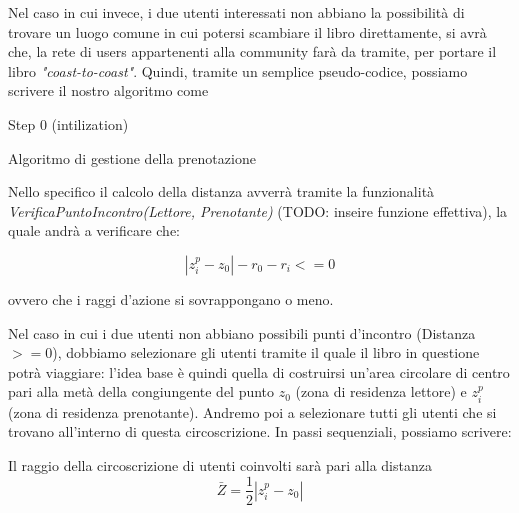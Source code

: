 \begin{itemize}
\begin{itemize}
		Nel caso in cui invece, i due utenti interessati non abbiano la possibilità di trovare un luogo comune in cui potersi scambiare il libro direttamente, si avrà che, la rete di users appartenenti alla community farà da tramite, per portare il libro \textit{"coast-to-coast"}.
		Quindi, tramite un semplice pseudo-codice, possiamo scrivere il nostro algoritmo come
	
		\begin{algorithm}[H]
			\SetAlgoLined
			Step 0 (intilization)\;
			\caption{Algoritmo di gestione della prenotazione}
		\end{algorithm}
		
		
		Nello specifico il calcolo della distanza avverrà tramite la funzionalità \textit{VerificaPuntoIncontro(Lettore, Prenotante)} (TODO: inseire funzione effettiva), la quale andrà a verificare che:
		
		{\LARGE \begin{equation}
			|z^{p}_{i}-z_{0}|-r_{0}-r_{i}<=0
		\end{equation}}
		
		ovvero che i raggi d'azione si sovrappongano o meno.
		
		Nel caso in cui i due utenti non abbiano possibili punti d'incontro (Distanza $>= 0 $), dobbiamo selezionare gli utenti tramite il quale il libro in questione potrà viaggiare: l'idea base è quindi quella di costruirsi un'area circolare di centro pari alla metà della congiungente del punto $ z_{0} $ (zona di residenza lettore) e $ z^{p}_{i} $ (zona di residenza prenotante).
		Andremo poi a selezionare tutti gli utenti che si trovano all'interno di questa circoscrizione.
		In passi sequenziali, possiamo scrivere:
		
		\begin{algorithm}[H]
			\SetAlgoLined
			
			
			Il raggio della circoscrizione di utenti coinvolti sarà pari alla distanza
			\[ \bar{Z} = \dfrac{1}{2} |z^{p}_{i}-z_{0}| \]
\end{algorithm}
\end{itemize}
\end{itemize}
